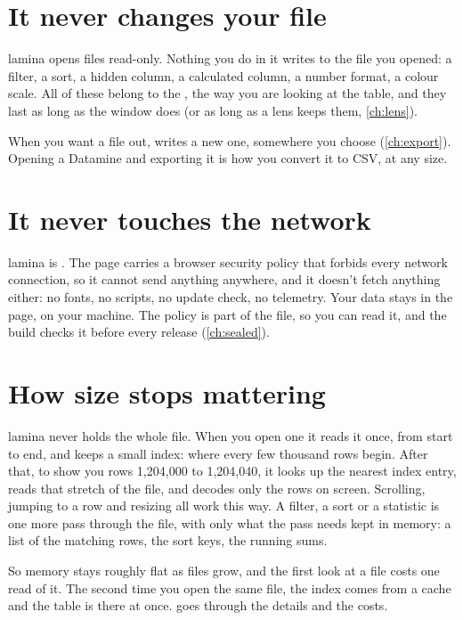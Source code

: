 \section{It never changes your file}\label{sec:read-only}

lamina opens files read-only. Nothing you do in it writes to the file you opened: a filter, a sort, a
hidden column, a calculated column, a number format, a colour scale. All of these belong to the
, the way you are looking at the table, and they last as long as the window does (or as long
as a lens keeps them, \cref{ch:lens}).

When you want a file out,  writes a new one, somewhere you choose
(\cref{ch:export}). Opening a Datamine  and exporting it is how you convert it to CSV, at any
size.

\section{It never touches the network}\label{sec:never-network}

lamina is . The page carries a browser security policy that forbids every network
connection, so it cannot send anything anywhere, and it doesn't fetch anything either: no fonts, no
scripts, no update check, no telemetry. Your data stays in the page, on your machine. The policy is
part of the file, so you can read it, and the build checks it before every release (\cref{ch:sealed}).

\section{How size stops mattering}\label{sec:windowed}

lamina never holds the whole file. When you open one it reads it once, from start to end, and keeps a
small index: where every few thousand rows begin. After that, to show you rows 1{,}204{,}000 to
1{,}204{,}040, it looks up the nearest index entry, reads that stretch of the file, and decodes only
the rows on screen. Scrolling, jumping to a row and resizing all work this way. A filter, a sort or a
statistic is one more pass through the file, with only what the pass needs kept in memory: a list of the
matching rows, the sort keys, the running sums.

So memory stays roughly flat as files grow, and the first look at a file costs one read of it. The
second time you open the same file, the index comes from a cache and the table is there at once.  goes through the details and the costs.

